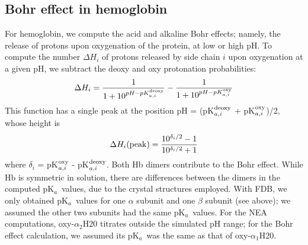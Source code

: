 \documentclass[a4paper,12pt]{article}
\newcommand{\pk}{pK$_a$}
\begin{document}
\subsection{Bohr effect in hemoglobin}
For hemoglobin, we compute the acid and alkaline Bohr effects; namely, the release of protons upon oxygenation of the
protein, at low or high pH. To compute the number $\Delta H_i$ of protons released by side chain $i$ upon oxygenation
at a given pH, we subtract the deoxy and oxy protonation probabilities:
\begin{equation}
\Delta H_i = \frac{1}{1+10^{pH-pK_{a,i}^{\rm deoxy}}} -\frac{1}{1+10^{pH-pK_{a,i}^{\rm oxy}}}  \label{eq:bohr}
\end{equation} 
This function has a single peak at the position pH = (pK$_{a,i}^{\rm deoxy}$ + pK$_{a,i}^{\rm oxy}$)/2, whose height is
\begin{equation}
\Delta H_i({\rm peak}) = \frac{10^{\delta_i/2}-1}{10^{\delta_i/2}+1}
\end{equation} 
where $\delta_i$ = pK$_{a,i}^{\rm oxy}$ - pK$_{a,i}^{\rm deoxy}$. Both Hb dimers contribute to the Bohr effect.  While Hb
is symmetric in solution, there are differences between the dimers in the computed \pk\ values, due to the crystal
structures employed. With FDB, we only obtained \pk\ values for one $\alpha$ subunit and one $\beta$ subunit (see above);
we assumed the other two subunits had the same \pk\ values. For the NEA computations, oxy-$\alpha_2$H20 titrates outside
the simulated pH range; for the Bohr effect calculation, we assumed its \pk\ was the same as that of oxy-$\alpha_1$H20. 
\end{document}
